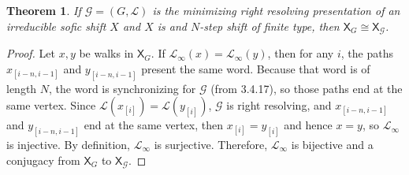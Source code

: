 \documentclass{article}
\newcommand{\G}{\mathcal{G}}  %
\newcommand{\shift}[1]{\mathsf{X}_{#1}}
\newtheorem{theorem}{Theorem}
\begin{document}
    \begin{theorem}
        If \(\mathcal{G} = (G, \mathcal{L})\) is the minimizing right resolving
        presentation of an irreducible sofic shift \(X\) and \(X\) is and
        \(N\)-step shift of finite type, then \(\shift{G} \cong \shift{\G}\).
    \end{theorem}
    \begin{proof}
        Let \(x, y\) be walks in \(\shift{G}\). If \(\mathcal{L}_\infty(x)=\mathcal{L}_\infty(y)\),
        then for any \(i\), the paths \(x_{[i-n, i-1]}\) and \(y_{[i-n, i-1]}\) present 
        the same word. Because that word is of length \(N\), the word is synchronizing
        for \(\mathcal{G}\) (from 3.4.17), so those paths end at the same vertex. Since
        \(\mathcal{L}(x_{[i]}) = \mathcal{L}(y_{[i]})\), \(\mathcal{G}\) is right 
        resolving, and \(x_{[i-n, i-1]}\) and \(y_{[i-n, i-1]}\) end at the same vertex,
        then \(x_{[i]} = y_{[i]}\) and hence \(x = y\), so \(\mathcal{L}_\infty\) is injective.
        By definition, \(\mathcal{L}_\infty\) is surjective. Therefore, \(\mathcal{L}_\infty\) is bijective and 
        a conjugacy from \(\mathsf{X}_G\) to \(\mathsf{X}_\mathcal{G}\).
    \end{proof}
\end{document}
